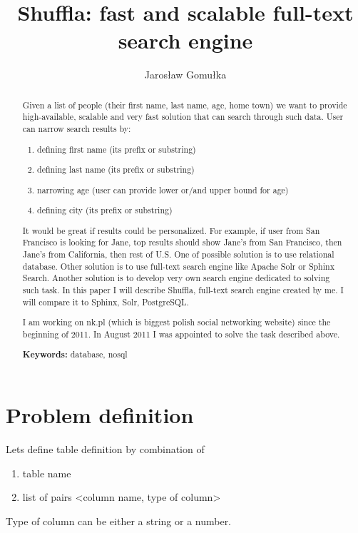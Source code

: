 \documentclass[10pt,a4paper]{article}
\begin{document}
\title{Shuffla: fast and scalable full-text search engine}
\author{Jarosław Gomułka}

\maketitle

\begin{abstract}
Given a list of people (their first name, last name, age, home town) we want to provide high-available, scalable and very fast solution that can search through such data.
User can narrow search results by:

\bigskip
\begin{enumerate}
\item{defining first name (its prefix or substring)}
\item{defining last name (its prefix or substring)}
\item{narrowing age (user can provide lower or/and upper bound for age)}
\item{defining city (its prefix or substring)}
\end{enumerate}

\bigskip
It would be great if results could be personalized. For example, if user from San Francisco is looking for Jane, top results should show Jane's from San Francisco, then Jane's from California, then rest of U.S. One of possible solution is to use relational database. Other solution is to use full-text search engine like Apache Solr or Sphinx Search. Another solution is to develop very own search engine dedicated to solving such task. In this paper I will describe Shuffla, full-text search engine created by me. I will compare it to Sphinx, Solr, PostgreSQL. 

\bigskip
I am working on nk.pl (which is biggest polish social networking website) since the beginning of 2011. In August 2011 I was appointed to solve the task described above. 

\bigskip
\noindent \textbf{Keywords:} database, nosql
\end{abstract}


\section{Problem definition}

Lets define table definition by combination of
\begin{enumerate}
\item table name
\item list of pairs <column name, type of column>
\end{enumerate}
Type of column can be either a string or a number.
\end{document}
